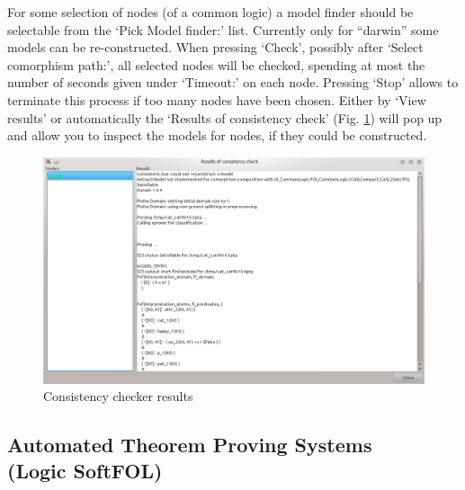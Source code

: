 \documentclass{article}
\begin{document}
For some selection of nodes (of a common logic) a model finder should be
selectable from the `Pick Model finder:' list. Currently only for ``darwin''
some \CASL models can be re-constructed. When pressing `Check', possibly after
`Select comorphism path:', all selected nodes will be checked, spending at
most the number of seconds given under `Timeout:' on each node. Pressing
`Stop' allows to terminate this process if too many nodes have been chosen.
Either by `View results' or automatically the `Results of consistency check'
(Fig. \ref{fig:cons_res}) will pop up and allow you to inspect the models for
nodes, if they could be constructed.

\begin{figure}[ht]
  \centering
  \includegraphics[width=0.75\linewidth,keepaspectratio=true]{UserGuideCL_Consistency_Result}
  \caption{Consistency checker results\label{fig:cons_res}}
\end{figure}

\subsection[Automated Theorem Proving Systems]
{Automated Theorem Proving Systems\\(Logic SoftFOL)}
\label{sec:ATP}
\end{document}
